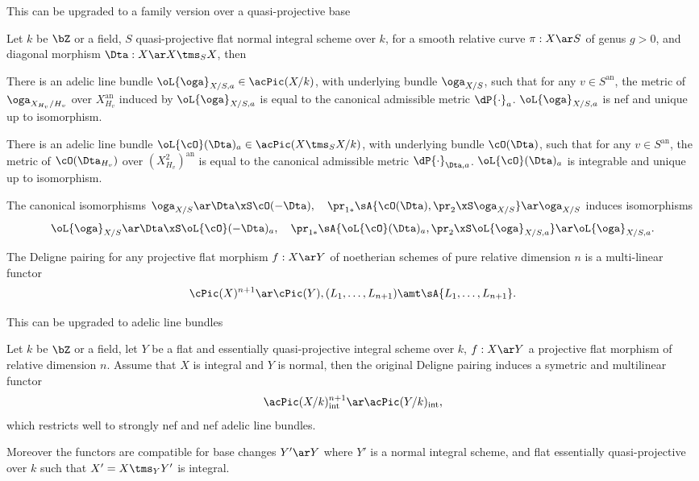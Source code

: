 \documentclass[article, a4paper, twoside]{universal}
\begin{document}
This can be upgraded to a family version over a quasi-projective base
\begin{thm}
	Let $k$ be $\bZ$ or a field, $S$ quasi-projective flat normal integral scheme over $k$, for a smooth relative curve $\pi:X\ar S$ of genus $g>0$, and diagonal morphism $\Dta:X\ar X\tms_{S}X$, then
	\begin{enr}
		\item There is an adelic line bundle $\oL{\oga}_{X/S,a}\in\acPic(X/k)$, with underlying bundle $\oga_{X/S}$, such that for any $v\in S^{\mathrm{an}}$, the metric of $\oga_{X_{H_{v}}/H_{v}}$ over $X_{H_{v}}^{\mathrm{an}}$ induced by $\oL{\oga}_{X/S,a}$ is equal to the canonical admissible metric $\dP{\cdot}_{a}$. $\oL{\oga}_{X/S,a}$ is nef and unique up to isomorphism.
		\item There is an adelic line bundle $\oL{\cO}(\Dta)_{a}\in\acPic(X\tms_{S}X/k)$, with underlying bundle $\cO(\Dta)$, such that for any $v\in S^{\mathrm{an}}$, the metric of $\cO(\Dta_{H_{v}})$ over $(X_{H_{v}}^{2})^{\mathrm{an}}$ is equal to the canonical admissible metric $\dP{\cdot}_{\Dta,a}$. $\oL{\cO}(\Dta)_{a}$ is integrable and unique up to isomorphism.
		\item The canonical isomorphisms $\oga_{X/S}\ar\Dta\xS\cO(-\Dta),\quad \pr_{1*}\sA{\cO(\Dta),\pr_{2}\xS\oga_{X/S}}\ar\oga_{X/S}$ induces isomorphisms
		\[
			\oL{\oga}_{X/S}\ar\Dta\xS\oL{\cO}(-\Dta)_{a},\quad \pr_{1*}\sA{\oL{\cO}(\Dta)_{a},\pr_{2}\xS\oL{\oga}_{X/S,a}}\ar\oL{\oga}_{X/S,a}.
		\]
	\end{enr}
\end{thm}

The Deligne pairing for any projective flat morphism $f:X\ar Y$ of noetherian schemes of pure relative dimension $n$ is a multi-linear functor
\[
	\cPic(X)^{n+1}\ar\cPic(Y), (L_{1},\ldots,L_{n+1})\amt\sA{L_{1},\ldots,L_{n+1}}.
\]


This can be upgraded to adelic line bundles
\begin{thm}[{\cite[Theorem~4.1.2]{YZ2021}}]
	Let $k$ be $\bZ$ or a field, let $Y$ be a flat and essentially quasi-projective integral scheme over $k$, $f:X\ar Y$ a projective flat morphism of relative dimension $n$. Assume that $X$ is integral and $Y$ is normal, then the original Deligne pairing induces a symetric and multilinear functor
	\[
		\acPic(X/k)_{\mathrm{int}}^{n+1}\ar\acPic(Y/k)_{\mathrm{int}},
	\]
	which restricts well to strongly nef and nef adelic line bundles.

	Moreover the functors are compatible for base changes $Y'\ar Y$ where $Y'$ is a normal integral scheme, and flat essentially quasi-projective over $k$ such that $X'=X\tms_{Y}Y'$ is integral.
\end{thm}
\end{document}

